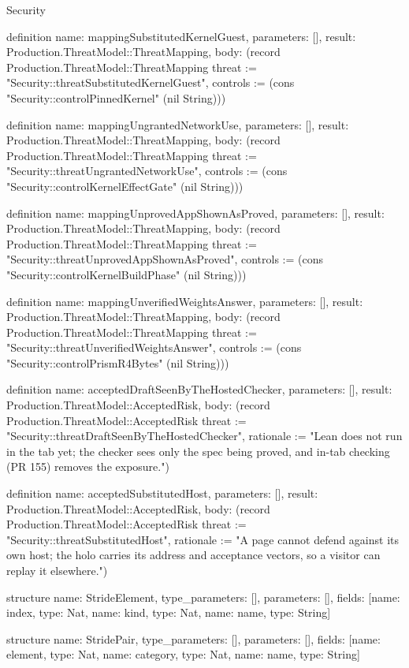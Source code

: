 \begin{lexlean}{Security}
\begin{semanticmodule}
definition{
  name: mappingSubstitutedKernelGuest,
  parameters: [],
  result: Production.ThreatModel::ThreatMapping,
  body: (record Production.ThreatModel::ThreatMapping {threat := "Security::threatSubstitutedKernelGuest", controls := (cons "Security::controlPinnedKernel" (nil String))})
}

definition{
  name: mappingUngrantedNetworkUse,
  parameters: [],
  result: Production.ThreatModel::ThreatMapping,
  body: (record Production.ThreatModel::ThreatMapping {threat := "Security::threatUngrantedNetworkUse", controls := (cons "Security::controlKernelEffectGate" (nil String))})
}

definition{
  name: mappingUnprovedAppShownAsProved,
  parameters: [],
  result: Production.ThreatModel::ThreatMapping,
  body: (record Production.ThreatModel::ThreatMapping {threat := "Security::threatUnprovedAppShownAsProved", controls := (cons "Security::controlKernelBuildPhase" (nil String))})
}

definition{
  name: mappingUnverifiedWeightsAnswer,
  parameters: [],
  result: Production.ThreatModel::ThreatMapping,
  body: (record Production.ThreatModel::ThreatMapping {threat := "Security::threatUnverifiedWeightsAnswer", controls := (cons "Security::controlPrismR4Bytes" (nil String))})
}

definition{
  name: acceptedDraftSeenByTheHostedChecker,
  parameters: [],
  result: Production.ThreatModel::AcceptedRisk,
  body: (record Production.ThreatModel::AcceptedRisk {threat := "Security::threatDraftSeenByTheHostedChecker", rationale := "Lean does not run in the tab yet; the checker sees only the spec being proved, and in-tab checking (PR 155) removes the exposure."})
}

definition{
  name: acceptedSubstitutedHost,
  parameters: [],
  result: Production.ThreatModel::AcceptedRisk,
  body: (record Production.ThreatModel::AcceptedRisk {threat := "Security::threatSubstitutedHost", rationale := "A page cannot defend against its own host; the holo carries its address and acceptance vectors, so a visitor can replay it elsewhere."})
}

structure{
  name: StrideElement,
  type_parameters: [],
  parameters: [],
  fields: [{name: index, type: Nat}, {name: kind, type: Nat}, {name: name, type: String}]
}

structure{
  name: StridePair,
  type_parameters: [],
  parameters: [],
  fields: [{name: element, type: Nat}, {name: category, type: Nat}, {name: name, type: String}]
}


\end{semanticmodule}
\end{lexlean}
